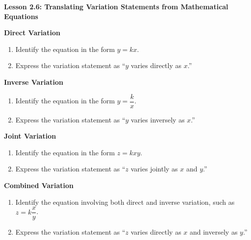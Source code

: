   \begin{center}
\textbf{Lesson 2.6: Translating Variation Statements from Mathematical Equations}
\end{center}

\vspace*{-1.5ex} 

\noindent\textbf{Direct Variation}
\begin{enumerate}
    \item Identify the equation in the form $y = kx$.
    \item Express the variation statement as ``$ y $ varies directly as $x$.''
\end{enumerate}

\noindent\textbf{Inverse Variation}
\begin{enumerate}
    \item Identify the equation in the form $y = \dfrac{k}{x}$.
    \item Express the variation statement as ``$ y $ varies inversely as $x$.''
\end{enumerate}

\noindent\textbf{Joint Variation}
\begin{enumerate}
    \item Identify the equation in the form $z = kxy$.
    \item Express the variation statement as ``$z$ varies jointly as $x$ and $y$.''
\end{enumerate}

\noindent\textbf{Combined Variation}
\begin{enumerate}
    \item Identify the equation involving both direct and inverse variation, such as $z = k \dfrac{x}{y}$.
    \item Express the variation statement as ``$z$ varies directly as $x$ and inversely as $y$.''
\end{enumerate}


